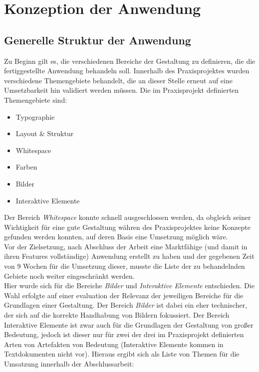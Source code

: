 \chapter{Konzeption der Anwendung}
\thispagestyle{fancy}

\section{Generelle Struktur der Anwendung}
Zu Beginn gilt es, die verschiedenen Bereiche der Gestaltung zu definieren, die die fertiggestellte Anwendung behandeln soll. Innerhalb des Praxisprojektes wurden verschiedene Themengebiete behandelt, die an dieser Stelle erneut auf eine Umsetzbarkeit hin validiert werden müssen. Die im Praxisprojekt definierten Themengebiete sind:

\begin{itemize}
  \item Typographie
  \item Layout \& Struktur
  \item Whitespace
  \item Farben
  \item Bilder
  \item Interaktive Elemente
\end{itemize}

Der Bereich \textit{Whitespace} konnte schnell ausgeschlossen werden, da obgleich seiner Wichtigkeit für eine gute Gestaltung währen des Praxisprojektes keine Konzepte gefunden werden konnten, auf deren Basis eine Umsetzung möglich wäre.\\
Vor der Zielsetzung, nach Abschluss der Arbeit eine Marktfähige (und damit in ihren Features vollständige) Anwendung erstellt zu haben und der gegebenen Zeit von 9 Wochen für die Umsetzung dieser, musste die Liste der zu behandelnden Gebiete noch weiter eingeschränkt werden.\\
Hier wurde sich für die Bereiche \textit{Bilder} und \textit{Interaktive Elemente} entschieden. Die Wahl erfolgte auf einer evaluation der Relevanz der jeweiligen Bereiche für die Grundlagen einer Gestaltung. Der Bereich \textit{Bilder} ist dabei ein eher technischer, der sich auf die korrekte Handhabung von Bildern fokussiert. Der Bereich Interaktive Elemente ist zwar auch für die Grundlagen der Gestaltung von großer Bedeutung, jedoch ist dieser nur für zwei der drei im Praxisprojekt definierten Arten von Artefakten von Bedeutung (Interaktive Elemente kommen in Textdokumenten nicht vor). Hieraus ergibt sich als Liste von Themen für die Umsatzung innerhalb der Abschlussarbeit:

